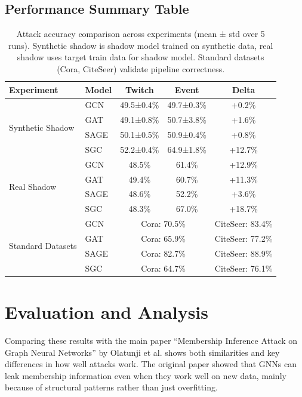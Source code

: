 \documentclass{article}
\begin{document}
\subsection{Performance Summary Table}

\begin{table}[H]
\centering
\caption{Attack accuracy comparison across experiments (mean ± std over 5 runs). Synthetic shadow is shadow model trained on synthetic data, real shadow uses target train data for shadow model. Standard datasets (Cora, CiteSeer) validate pipeline correctness.}
\label{tab:performance}
\begin{tabular}{|l|l|c|c|c|}
\hline
\textbf{Experiment} & \textbf{Model} & \textbf{Twitch} & \textbf{Event} & \textbf{Delta} \\
\hline
\multirow{4}{*}{Synthetic Shadow} & GCN & 49.5±0.4\% & 49.7±0.3\% & +0.2\% \\
 & GAT & 49.1±0.8\% & 50.7±3.8\% & +1.6\% \\
 & SAGE & 50.1±0.5\% & 50.9±0.4\% & +0.8\% \\
 & SGC & 52.2±0.4\% & 64.9±1.8\% & +12.7\% \\
\hline
\multirow{4}{*}{Real Shadow} & GCN & 48.5\% & 61.4\% & +12.9\% \\
 & GAT & 49.4\% & 60.7\% & +11.3\% \\
 & SAGE & 48.6\% & 52.2\% & +3.6\% \\
 & SGC & 48.3\% & 67.0\% & +18.7\% \\
\hline
\multirow{4}{*}{Standard Datasets} & GCN & \multicolumn{2}{c|}{Cora: 70.5\%} & CiteSeer: 83.4\% \\
 & GAT & \multicolumn{2}{c|}{Cora: 65.9\%} & CiteSeer: 77.2\% \\
 & SAGE & \multicolumn{2}{c|}{Cora: 82.7\%} & CiteSeer: 88.9\% \\
 & SGC & \multicolumn{2}{c|}{Cora: 64.7\%} & CiteSeer: 76.1\% \\
\hline
\end{tabular}
\end{table}

\section{Evaluation and Analysis}

Comparing these results with the main paper ``Membership Inference Attack on Graph Neural Networks'' by Olatunji et al.\cite{olatunji2021membershipinferenceattackgraph} shows both similarities and key differences in how well attacks work. The original paper showed that GNNs can leak membership information even when they work well on new data, mainly because of structural patterns rather than just overfitting.
\end{document}
